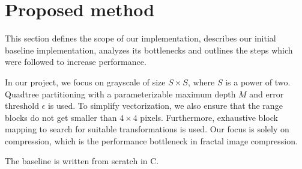 \section{Proposed method}\label{sec:yourmethod}

This section defines the scope of our implementation, describes our initial baseline
implementation, analyzes its bottlenecks and outlines the steps which were followed to
increase performance.

In our project, we focus on grayscale of size $S \times S$, where $S$ is a power of two.
Quadtree partitioning with a parameterizable maximum depth $M$ and error threshold $\epsilon$ is used. 
To simplify vectorization, we also ensure that the range blocks do not get smaller than $4 \times 4$ pixels.
Furthermore, exhaustive block mapping to search for suitable transformations is used.
Our focus is solely on compression, which is the performance bottleneck in fractal image compression.

The baseline is written from scratch in C.

